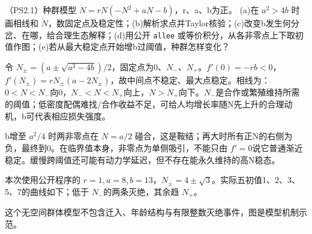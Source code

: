 \begin{exercise}\label{task:chaos-PS2-1}
（PS2.1）种群模型 $\dot N=rN(-N^2+aN-b)$，r、a、b为正。
(a)在 $a^2>4b$ 时画相线和 $\dot N$，数固定点及稳定性；(b)解析求点并Taylor核验；(c)改变b发生何分岔、在哪，给合理生态解释；(d)用公开 \texttt{allee} 或等价积分，从各非零点上下取初值作图；(e)若从最大稳定点开始增b过阈值，种群怎样变化？
\end{exercise}
\begin{solution}
令 $N_\pm=(a\pm\sqrt{a^2-4b})/2$，固定点为0、$N_-$、$N_+$。$f'(0)=-rb<0$，$f'(N_\pm)=rN_\pm(a-2N_\pm)$，故中间点不稳定、最大点稳定。相线为：$0<N<N_-$向0，$N_-<N<N_+$向上，$N>N_+$向下。$N_-$是合作或繁殖维持所需的阈值；低密度配偶难找/合作收益不足，可给人均增长率随N先上升的合理动机，b可代表相应损失强度。

b增至 $a^2/4$ 时两非零点在 $N=a/2$ 碰合，这是鞍结；再大时所有正N的右侧为负，最终到0。在临界值本身，非零点为单侧吸引，不能只由 $f'=0$说它普通渐近稳定。缓慢跨阈值还可能有动力学延迟，但不存在能永久维持的高N稳态。

本次使用公开程序的 $r=1,a=8,b=13$，$N_\pm=4\pm\sqrt3$。实际五初值1、2、3、5、7的曲线如下；低于 $N_-$的两条灭绝，其余趋 $N_+$。
\begin{center}\end{center}
这个无空间群体模型不包含迁入、年龄结构与有限整数灭绝事件，图是模型机制示范。
\end{solution}

